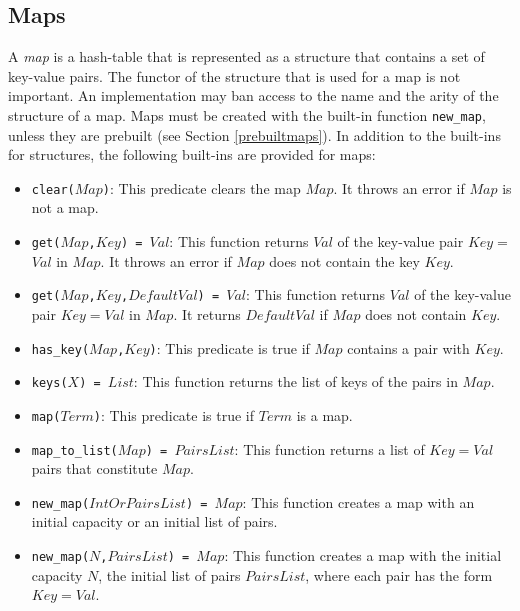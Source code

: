 \subsection{Maps}
A \emph{map} is a hash-table that is represented as a structure that contains a set of key-value pairs. The functor of the structure that is used for a map is not important.  An implementation may ban access to the name and the arity of the structure of a map. Maps must be created with the built-in function \texttt{new\_map}, unless they are prebuilt (see Section \ref{prebuiltmaps}). In addition to the built-ins for structures, the following built-ins are provided for maps:
\begin{itemize}
\item \texttt{clear($Map$)}: This predicate clears the map $Map$. It throws an error if $Map$ is not a map.
\item \texttt{get($Map$,$Key$) = $Val$}: This function returns \texttt{$Val$} of the key-value pair \texttt{$Key$$=$$Val$} in \texttt{$Map$}. It throws an error if $Map$ does not contain the key $Key$.
\item \texttt{get($Map$,$Key$,$DefaultVal$) = $Val$}: This function returns \texttt{$Val$} of the key-value pair \texttt{$Key$$=$$Val$} in \texttt{$Map$}. It returns $DefaultVal$ if $Map$ does not contain $Key$.
\item \texttt{has\_key($Map$,$Key$)}: This predicate is true if $Map$ contains a pair with $Key$. 
\item \texttt{keys($X$) = $List$}: This function returns the list of keys of the pairs in $Map$.
\item \texttt{map($Term$)}: This predicate is true if $Term$ is a map. 
\item \texttt{map\_to\_list($Map$) = $PairsList$}: This function returns a list of \texttt{$Key$$=$$Val$} pairs that constitute $Map$. 
\item \texttt{new\_map($IntOrPairsList$) = $Map$}: This function creates a map with an initial capacity or an initial list of pairs.
\item \texttt{new\_map($N$,$PairsList$) = $Map$}: This function creates a map with the initial capacity $N$, the initial list of pairs $PairsList$, where each pair has the form \texttt{$Key$$=$$Val$}.

\end{itemize}
